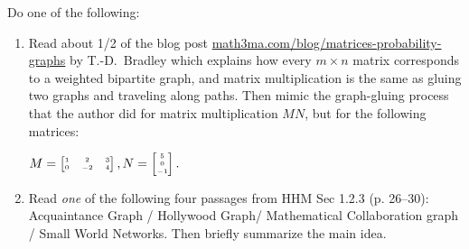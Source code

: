 \documentclass[10pt]{amsart}
\begin{document}
Do one of the following:
\begin{enumerate}
\item
Read about 1/2 of the blog post
\href{https://www.math3ma.com/blog/matrices-probability-graphs}{math3ma.com/blog/matrices-probability-graphs} by 
T.-D.~Bradley 
which explains how every $m \times n$ matrix corresponds to a weighted bipartite graph, and matrix multiplication is the same as gluing two graphs and traveling along paths. 
Then
mimic 
the graph-gluing process that the author did for matrix multiplication $MN$, but for the following matrices:

$
\tiny
M=
\begin{bmatrix}
1 & 2 & 3\\
0 & -2 & 4
\end{bmatrix},
N = 
\begin{bmatrix}
5 \\
0 \\
-1
\end{bmatrix}.
$

\item
Read \emph{one} of the following four passages from HHM Sec 1.2.3 (p. 26--30): Acquaintance Graph / Hollywood Graph/ Mathematical Collaboration graph / Small World Networks. Then briefly summarize the main idea.


\end{enumerate}


\end{document}
